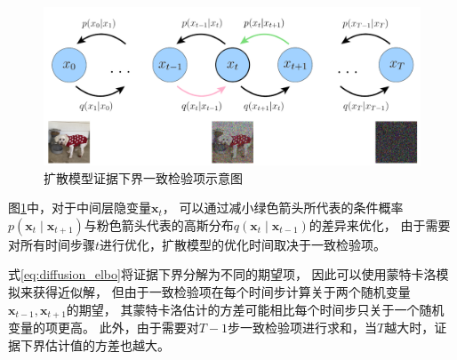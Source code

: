 \begin{figure}[ht]
    \centering
    \includegraphics[width=\textwidth]{figures/diffusion_model_optimize_elbo}
    \caption{扩散模型证据下界一致检验项示意图}\label{fig:diffusion_model_optimize_elbo}
\end{figure}

图{\ref{fig:diffusion_model_optimize_elbo}}中，对于中间层隐变量{$\bm{x}_t$}，
可以通过减小绿色箭头所代表的条件概率{$p(\bm{x}_{t}\mid \bm{x}_{t+1})$}与粉色箭头代表的高斯分布{$q(\bm{x}_{t}\mid \bm{x}_{t-1})$}的差异来优化，
由于需要对所有时间步骤{$t$}进行优化，扩散模型的优化时间取决于一致检验项。

式{\ref{eq:diffusion_elbo}}将证据下界分解为不同的期望项，
因此可以使用蒙特卡洛模拟来获得近似解，
但由于一致检验项在每个时间步计算关于两个随机变量{$\bm{x}_{t-1},\bm{x}_{t+1}$}的期望，
其蒙特卡洛估计的方差可能相比每个时间步只关于一个随机变量的项更高。
此外，由于需要对{$T-1$}步一致检验项进行求和，当{$T$}越大时，证据下界估计值的方差也越大。

